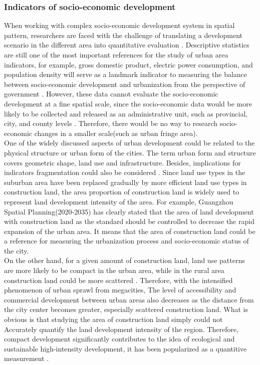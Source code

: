 \subsubsection{Indicators of socio-economic development}
When working with complex socio-economic development system in spatial pattern, researchers are faced with the challenge of translating a development scenario in the different area into quantitative evaluation \parencite{zhou_nighttime_2015}. Descriptive statistics are still one of the most important references for the study of urban area indicators, for example, gross domestic product, electric power consumption, and population density will serve as a landmark indicator to measuring the balance between socio-economic development and urbanization from the perspective of government \parencite{zhao_tweets_2018}. However, these data cannot evaluate the socio-economic development at a fine spatial scale, since the socio-economic data would be more likely to be collected and released as an administrative unit, such as provincial, city, and county levels \parencite{peng_integrating_2020}. Therefore, there would be no way to research socio-economic changes in a smaller scale(such as urban fringe area).  \\

One of the widely discussed aspects of urban development could be related to the physical structure or urban form of the cities. The term urban form and structure covers geometric shape, land use and infrastructure. Besides, implications for indicators fragmentation could also be considered \parencite{dominik_wiedenhofer_energy_2013}. Since land use types in the suburban area have been replaced gradually by more efficient land use types in construction land, the area proportion of construction land is widely used to represent land development intensity of the area. For example, Guangzhou Spatial Planning(2020-2035) has clearly stated that the area of land development with construction land as the standard should be controlled to decrease the rapid expansion of the urban area. It means that the area of construction land could be a reference for measuring the urbanization process and socio-economic status of the city. \\

On the other hand, for a given amount of construction land, land use patterns are more likely to be compact in the urban area, while in the rural area construction land could be more scattered \parencite{zhang_can_2013}. Therefore, with the intensified phenomenon of urban sprawl from megacities, The level of accessibility and commercial development between urban areas also decreases as the distance from the city center becomes greater, especially scattered construction land. What is obvious is that studying the area of construction land simply could not Accurately quantify the land development intensity of the region. Therefore, compact development significantly contributes to the idea of ecological and sustainable high-intensity development, it has been popularized as a quantitive measurement \parencite{rahman_gis-based_2022}.\\

